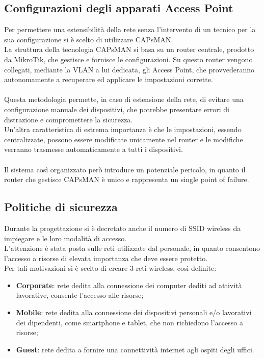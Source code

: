 \documentclass[Realizzazione.tex]{subfiles}
\begin{document}
\subsection{Configurazioni degli apparati Access Point}
Per permettere una estensibilità della rete senza l'intervento di un tecnico per la sua configurazione si è scelto di utilizzare CAPsMAN. \\
La struttura della tecnologia CAPsMAN si basa su un router centrale, prodotto da MikroTik, che gestisce e fornisce le configurazioni. Su questo router vengono collegati, mediante la VLAN a lui dedicata, gli Access Point, che provvederanno autonomamente a recuperare ed applicare le impostazioni corrette. \\\\
Questa metodologia permette, in caso di estensione della rete, di evitare una configurazione manuale dei dispositivi, che potrebbe presentare errori di distrazione e compromettere la sicurezza. \\
Un'altra caratteristica di estrema importanza è che le impostazioni, essendo centralizzate, possono essere modificate unicamente nel router e le modifiche verranno trasmesse automaticamente a tutti i dispositivi. \\\\
Il sistema così organizzato però introduce un potenziale pericolo, in quanto il router che gestisce CAPsMAN è unico e rappresenta un single point of failure.

\newpage
\subsection{Politiche di sicurezza}
Durante la progettazione si è decretato anche il numero di SSID wireless da impiegare e le loro modalità di accesso. \\
L'attenzione è stata posta sulle reti utilizzate dal personale, in quanto consentono l'accesso a risorse di elevata importanza che deve essere protetto. \\
Per tali motivazioni si è scelto di creare 3 reti wireless, così definite:
\begin{itemize}
	\item \textbf{Corporate}: rete dedita alla connessione dei computer dediti ad attività lavorative, consente l'accesso alle risorse;
	\item \textbf{Mobile}: rete dedita alla connessione dei dispositivi personali e/o lavorativi dei dipendenti, come smartphone e tablet, che non richiedono l'accesso a risorse;
	\item \textbf{Guest}: rete dedita a fornire una connettività internet agli ospiti degli uffici.
\end{itemize}
\end{document}
